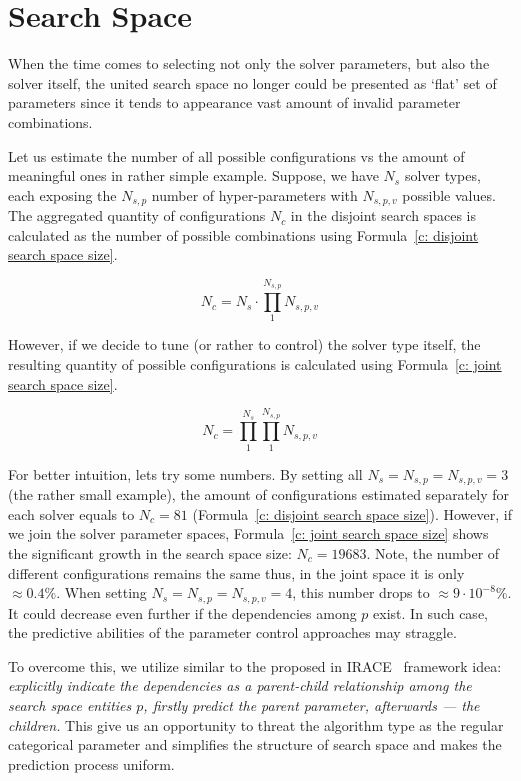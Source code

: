 \section{Search Space}\label{concept:search space}
When the time comes to selecting not only the solver parameters, but also the solver itself, the united search space no longer could be presented as `flat' set of parameters since it tends to appearance vast amount of invalid parameter combinations.

Let us estimate the number of all possible configurations vs the amount of meaningful ones in rather simple example.
Suppose, we have $N_s$ solver types, each exposing the $N_{s,p}$ number of hyper-parameters with $N_{s,p,v}$ possible values. The aggregated quantity of configurations $N_c$ in the disjoint search spaces is calculated as the number of possible combinations using Formula~\ref{c: disjoint search space size}.

\begin{equation}
N_c = N_s \cdot \prod_{1}^{N_{s,p}} N_{s,p,v}
\label{c: disjoint search space size}
\end{equation}

However, if we decide to tune (or rather to control) the solver type itself, the resulting quantity of possible configurations is calculated using Formula~\ref{c: joint search space size}.

\begin{equation}
N_c = \prod_{1}^{N_{s}} \prod_{1}^{N_{s,p}} N_{s,p,v}
\label{c: joint search space size}
\end{equation}

For better intuition, lets try some numbers. By setting all $N_s = N_{s,p} = N_{s,p,v} = 3$ (the rather small example), the amount of configurations estimated separately for each solver equals to $N_c = 81$ (Formula~\ref{c: disjoint search space size}). However, if we join the solver parameter spaces, Formula~\ref{c: joint search space size} shows the significant growth in the search space size: $N_c = 19683$. Note, the number of different configurations remains the same thus, in the joint space it is only $\approx 0.4\%$. When setting $N_s = N_{s,p} = N_{s,p,v} = 4$, this number drops to $\approx 9 \cdot 10^{-8}\%$. It could decrease even further if the dependencies among $p$ exist. In such case, the predictive abilities of the parameter control approaches may straggle.

To overcome this, we utilize similar to the proposed in IRACE~\cite{lopez2016irace} framework idea: \emph{explicitly indicate the dependencies as a parent-child relationship among the search space entities $p$, firstly predict the parent parameter, afterwards — the children.} This give us an opportunity to threat the algorithm type as the regular categorical parameter and simplifies the structure of search space and makes the prediction process uniform.

